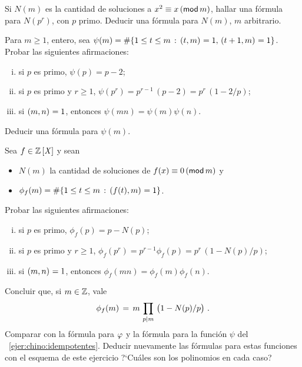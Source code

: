 \begin{ejerChino}\label{ejer:chino:idempotentes}
	Si $N(m)$ es la cantidad de soluciones a $x^2\equiv x\tmodulo[m]$,
	hallar una f\'ormula para $N(p^r)$, con $p$ primo.%
	Deducir una f\'ormula para $N(m)$, $m$ arbitrario.
\end{ejerChino}

\begin{ejerChino}\label{ejer:chino:idempotentes:bis}
	Para $m\geq 1$, entero, sea
	\begin{math}
		\psi(m)=\cardinal{%
			\{1\leq t\leq m\,:\,
				\mcd{t,m}=1,\,\mcd{t+1,m}=1\}
			}
	\end{math}.
	Probar las siguientes afirmaciones:
	\begin{enumerate}[(i)]
		\item si $p$ es primo, $\psi(p)=p-2$;
		\item si $p$ es primo y $r\geq 1$,
			$\psi(p^r)=p^{r-1}\,(p-2)=p^r\,(1-2/p)$;
		\item si $\mcd{m,n}=1$, entonces $\psi(mn)=\psi(m)\psi(n)$.
	\end{enumerate}
	Deducir una f\'ormula para $\psi(m)$.
\end{ejerChino}

\begin{ejerChino}\label{ejer:chino:polinomial}
	Sea $f\in\polinomios\Enteros$ y sean
	\begin{itemize}
		\item $N(m)$ la cantidad de soluciones de
			$f(x)\equiv 0\tmodulo[m]$ y
		\item
			\begin{math}
				\phi_f(m)=\cardinal{
					\{1\leq t\leq m\,:\,\mcd{f(t),m}=1\}
					}
			\end{math}.
	\end{itemize}
	Probar las siguientes afirmaciones:
	\begin{enumerate}[(i)]
		\item si $p$ es primo, $\phi_f(p)=p-N(p)$;
		\item si $p$ es primo y $r\geq 1$,
			$\phi_f(p^r)=p^{r-1}\phi_f(p)=p^r\,(1-N(p)/p)$;
		\item si $\mcd{m,n}=1$, entonces
			$\phi_f(mn)=\phi_f(m)\phi_f(n)$.
	\end{enumerate}
	Concluir que, si $m\in\Enteros$, vale
	\begin{displaymath}
		\phi_f(m)\,=\,m\,\prod_{p\mid m}\,\big(1-N(p)/p\big)
		\dispstop
	\end{displaymath}
	Comparar con la f\'ormula para $\eulerphi$ y la f\'ormula para
	la funci\'on $\psi$ del \ejername~\ref{ejer:chino:idempotentes}.
	Deducir nuevamente las f\'ormulas para estas funciones con el
	esquema de este ejercicio ?`Cu\'ales son los polinomios en cada
	caso?
\end{ejerChino}
